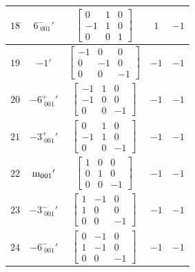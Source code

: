 \documentclass[fleqn,8pt]{jsarticle}
\begin{document}
\begin{longtable}{ccccc}
$ 18 $ & $ 6^{-}_{\,\,001}{}' $ & $ \begin{bmatrix} 0 & 1 & 0 \\ -1 & 1 & 0 \\ 0 & 0 & 1 \end{bmatrix} $ & $ 1 $ & $ -1 $ \\ \hline
$ 19 $ & $ -1{}' $ & $ \begin{bmatrix} -1 & 0 & 0 \\ 0 & -1 & 0 \\ 0 & 0 & -1 \end{bmatrix} $ & $ -1 $ & $ -1 $ \\ \hline
$ 20 $ & $ -6^{+}_{\,\,001}{}' $ & $ \begin{bmatrix} -1 & 1 & 0 \\ -1 & 0 & 0 \\ 0 & 0 & -1 \end{bmatrix} $ & $ -1 $ & $ -1 $ \\ \hline
$ 21 $ & $ -3^{+}_{\,\,001}{}' $ & $ \begin{bmatrix} 0 & 1 & 0 \\ -1 & 1 & 0 \\ 0 & 0 & -1 \end{bmatrix} $ & $ -1 $ & $ -1 $ \\ \hline
$ 22 $ & $ {\rm m}_{001}{}' $ & $ \begin{bmatrix} 1 & 0 & 0 \\ 0 & 1 & 0 \\ 0 & 0 & -1 \end{bmatrix} $ & $ -1 $ & $ -1 $ \\ \hline
$ 23 $ & $ -3^{-}_{\,\,001}{}' $ & $ \begin{bmatrix} 1 & -1 & 0 \\ 1 & 0 & 0 \\ 0 & 0 & -1 \end{bmatrix} $ & $ -1 $ & $ -1 $ \\ \hline
$ 24 $ & $ -6^{-}_{\,\,001}{}' $ & $ \begin{bmatrix} 0 & -1 & 0 \\ 1 & -1 & 0 \\ 0 & 0 & -1 \end{bmatrix} $ & $ -1 $ & $ -1 $ \\
\end{longtable}
\end{document}
